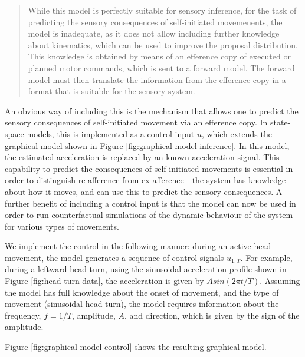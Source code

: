 \documentclass[english,floatsintext,man]{apa6}
\theoremstyle{definition}
\theoremstyle{definition}
\theoremstyle{remark}
\begin{document}
\begin{quote}
While this model is perfectly suitable for sensory inference, for the
task of predicting the sensory consequences of self-initiated
movemenents, the model is inadequate, as it does not allow including
further knowledge about kinematics, which can be used to improve the
proposal distribution. This knowledge is obtained by means of an
efference copy of executed or planned motor commands, which is sent to a
forward model. The forward model must then translate the information
from the efference copy in a format that is suitable for the sensory
system.
\end{quote}

An obvious way of including this is the mechanism that allows one to
predict the sensory consequences of self-initiated movement via an
efference copy. In state-space models, this is implemented as a control
input \(u\), which extends the graphical model shown in Figure
\ref{fig:graphical-model-inference}. In this model, the estimated
acceleration is replaced by an known acceleration signal. This
capability to predict the consequences of self-initiated movements is
essential in order to distinguish re-afference from ex-afference - the
system has knowledge about how it moves, and can use this to predict the
sensory consequences. A further benefit of including a control input is
that the model can now be used in order to run counterfactual
simulations of the dynamic behaviour of the system for various types of
movements.

We implement the control in the following manner: during an active head
movement, the model generates a sequence of control signals \(u_{1:T}\).
For example, during a leftward head turn, using the sinusoidal
acceleration profile shown in Figure \ref{fig:head-turn-data}, the
acceleration is given by \(Asin(2\pi t/T)\). Assuming the model has full
knowledge about the onset of movement, and the type of movement
(sinusoidal head turn), the model requires information about the
frequency, \(f = 1/T\), amplitude, \(A\), and direction, which is given
by the sign of the amplitude.

Figure \ref{fig:graphical-model-control} shows the resulting graphical
model.
\end{document}
